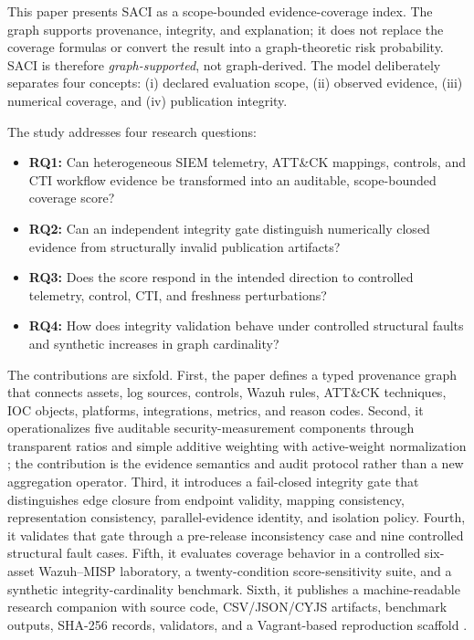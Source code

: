 \documentclass[a4paper,conference]{IEEEtran}
\begin{document}
This paper presents SACI as a scope-bounded evidence-coverage index. The graph supports provenance, integrity, and explanation; it does not replace the coverage formulas or convert the result into a graph-theoretic risk probability. SACI is therefore \emph{graph-supported}, not graph-derived. The model deliberately separates four concepts: (i) declared evaluation scope, (ii) observed evidence, (iii) numerical coverage, and (iv) publication integrity.

The study addresses four research questions:
\begin{itemize}
    \item \textbf{RQ1:} Can heterogeneous SIEM telemetry, ATT\&CK mappings, controls, and CTI workflow evidence be transformed into an auditable, scope-bounded coverage score?
    \item \textbf{RQ2:} Can an independent integrity gate distinguish numerically closed evidence from structurally invalid publication artifacts?
    \item \textbf{RQ3:} Does the score respond in the intended direction to controlled telemetry, control, CTI, and freshness perturbations?
    \item \textbf{RQ4:} How does integrity validation behave under controlled structural faults and synthetic increases in graph cardinality?
\end{itemize}

The contributions are sixfold. First, the paper defines a typed provenance graph that connects assets, log sources, controls, Wazuh rules, ATT\&CK techniques, IOC objects, platforms, integrations, metrics, and reason codes. Second, it operationalizes five auditable security-measurement components through transparent ratios and simple additive weighting with active-weight normalization \cite{nist80055v1,nist80055v2,iso27004,triantaphyllou2000}; the contribution is the evidence semantics and audit protocol rather than a new aggregation operator. Third, it introduces a fail-closed integrity gate that distinguishes edge closure from endpoint validity, mapping consistency, representation consistency, parallel-evidence identity, and isolation policy. Fourth, it validates that gate through a pre-release inconsistency case and nine controlled structural fault cases. Fifth, it evaluates coverage behavior in a controlled six-asset Wazuh--MISP laboratory, a twenty-condition score-sensitivity suite, and a synthetic integrity-cardinality benchmark. Sixth, it publishes a machine-readable research companion with source code, CSV/JSON/CYJS artifacts, benchmark outputs, SHA-256 records, validators, and a Vagrant-based reproduction scaffold \cite{fips1804,vagrant_docs,github_pages,github_actions,arslan_artifact}.
\end{document}
